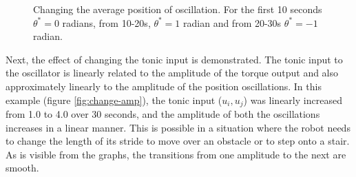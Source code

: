 \documentclass[12pt,twoside]{article}
\theoremstyle{plain}
\theoremstyle{definition}
\theoremstyle{remark}
\newcommand{\forceindent}{\leavevmode{\parindent=2em\indent}}
\begin{document}
\begin{figure}[H]
\centering     %
{}
\caption{Changing the average position of oscillation. For the first 10 seconds $\theta^*=0$ radians, from 10-20s, $\theta^*=1$ radian and from 20-30s $\theta^*=-1$ radian.}
\label{fig:change-avg-pos}
\end{figure}

\forceindent Next, the effect of changing the tonic input is demonstrated. 
The tonic input to the oscillator is linearly related to the amplitude of the torque output and also approximately linearly to the amplitude of the position oscillations. In this example (figure \ref{fig:change-amp}), the tonic input ($u_i,u_j$) was linearly increased from 1.0 to 4.0 over 30 seconds, and the amplitude of both the oscillations increases in a linear manner. This is possible in a situation where the robot needs to change the length of its stride to move over an obstacle or to step onto a stair. As is visible from the graphs, the transitions from one amplitude to the next are smooth.
\end{document}
